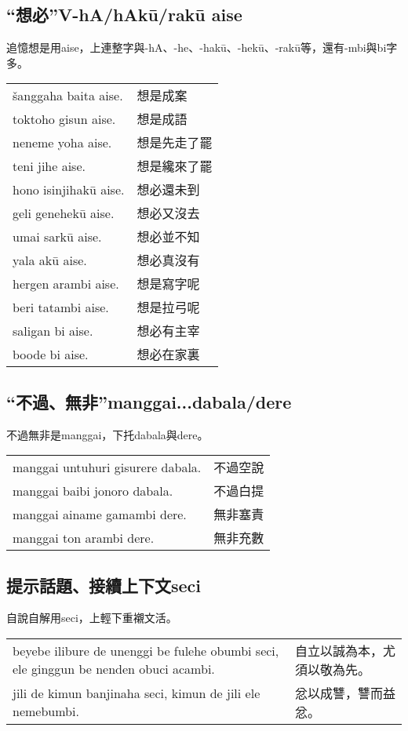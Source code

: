 \documentclass{article}
\begin{document}
\subsection{“想必”V-hA/hAk\={u}/rak\={u} aise}
\noindent 追憶想是用aise，上連整字與-hA、-he、-hak\={u}、-hek\={u}、-rak\={u}等，還有-mbi與bi字多。
\begin{center}
    \begin{tabularx}{\textwidth}{XX}
        \v{s}anggaha baita aise. & 想是成案\\
        toktoho gisun aise. & 想是成語\\
        neneme yoha aise. &想是先走了罷\\
        teni jihe aise. & 想是纔來了罷\\
        hono isinjihak\={u} aise. & 想必還未到\\
        geli genehek\={u} aise. &想必又沒去\\
        umai sark\={u} aise. & 想必並不知\\
        yala ak\={u} aise. &想必真沒有\\
        hergen arambi aise. & 想是寫字呢\\
        beri tatambi aise. & 想是拉弓呢\\
        saligan bi aise. &想必有主宰\\
        boode bi aise. &想必在家裏
    \end{tabularx}
\end{center}

\subsection{“不過、無非”manggai...dabala/dere}
\noindent 不過無非是manggai，下托dabala與dere。
\begin{center}
    \begin{tabularx}{\textwidth}{XX}
        manggai untuhuri gisurere dabala. & 不過空說\\
        manggai baibi jonoro dabala. &不過白提\\
        manggai ainame gamambi dere. & 無非塞責\\
        manggai ton arambi dere. & 無非充數
    \end{tabularx}
\end{center}

\subsection{提示話題、接續上下文seci}
\noindent 自說自解用seci，上輕下重襯文活。
\begin{center}
    \begin{tabularx}{\textwidth}{XX}
        beyebe ilibure de unenggi be fulehe obumbi seci, ele ginggun be nenden obuci acambi. & 自立以誠為本，尤須以敬為先。\\
        jili de kimun banjinaha seci, kimun de jili ele nemebumbi.& 忿以成讐，讐而益忿。
    \end{tabularx}
\end{center}
\end{document}
